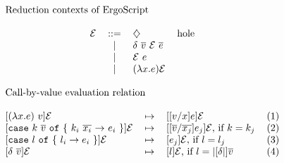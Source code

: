\begin{center}
\(\begin{array}{c}
\multicolumn{1}{l}{\text{Reduction contexts of \langname}}\\
\\
\begin{tabular}{@{}l c l l}
$\Ctx$ 	& ::= 		&	$\Hole$ 	&  hole \\
		& $\mid$ 	&	$\delta~\Ov{v}~\Ctx~\Ov{e}$	&  \\
		& $\mid$ 	&	$\Ctx~e$				&  \\
		& $\mid$ 	&	$(\Lam{x}{e})\Ctx$ 	&  \\
		& & \\
\end{tabular} \\
\multicolumn{1}{l}{\text{Call-by-value evaluation relation}}\\
\\
\begin{tabular}{@{}l c l r}
$[(\Lam{x}{e})~v]\Ctx$   & $\mapsto$ 	& 	$[[v/x]e]\Ctx$					    & (1)     \\
$[$\lst{case} $k~\Ov{v}$ \lst{of} \{ $k_i~\overline{x_i}$ $\rightarrow$ $e_i$  \}$]\Ctx$   & $\mapsto$ 	& 	$[[\overline{v}/\overline{x_j}]e_j]\Ctx$, if $k = k_j$	& (2)    \\
$[$\lst{case} $l$ \lst{of} \{ $l_i \rightarrow e_i$ \}$]\Ctx$   & $\mapsto$ 	& 	$[e_j]\Ctx$, if $l = l_j$	& (3)    \\
$[\delta~\overline{v}]\Ctx$   & $\mapsto$ 	& 	$[l]\Ctx$, if $l = |[\Prim|]\overline{v}$					    & (4)     \\

\end{tabular}
\end{array}\)
\end{center}
